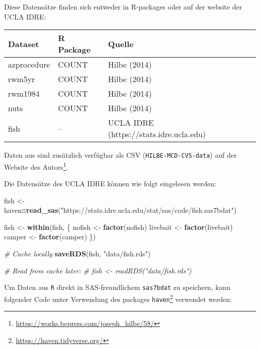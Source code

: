 \documentclass[ngerman,a4paper,]{scrartcl}
\newenvironment{Shaded}{\begin{snugshade}}{\end{snugshade}}
\newcommand{\CommentTok}[1]{\textcolor[rgb]{0.56,0.35,0.01}{\textit{#1}}}
\newcommand{\KeywordTok}[1]{\textcolor[rgb]{0.13,0.29,0.53}{\textbf{#1}}}
\newcommand{\NormalTok}[1]{#1}
\newcommand{\OperatorTok}[1]{\textcolor[rgb]{0.81,0.36,0.00}{\textbf{#1}}}
\newcommand{\StringTok}[1]{\textcolor[rgb]{0.31,0.60,0.02}{#1}}
\DeclareRobustCommand{\href}[2]{#2\footnote{\url{#1}}}
\theoremstyle{definition}
\theoremstyle{definition}
\theoremstyle{definition}
\theoremstyle{remark}
\begin{document}
Diese Datensätze finden sich entweder in R-packages oder auf der website der UCLA IDRE:

\begin{table}[H]
\centering
\begin{tabular}{lll}
\toprule
Dataset & R Package & Quelle\\
\midrule
azprocedure & COUNT & Hilbe (2014)\\
rwm5yr & COUNT & Hilbe (2014)\\
rwm1984 & COUNT & Hilbe (2014)\\
nuts & COUNT & Hilbe (2014)\\
fish & – & UCLA IDRE (https://stats.idre.ucla.edu)\\
\bottomrule
\end{tabular}
\end{table}

Daten aus \citet{hilbeModelingCountData2014} sind zusätzlich verfügbar als CSV (\texttt{HILBE-MCD-CVS-data}) auf \href{https://works.bepress.com/joseph_hilbe/58/}{der Website des Autors}.

Die Datensätze des UCLA IDRE können wie folgt eingelesen werden:

\begin{Shaded}
\begin{Highlighting}[]
\NormalTok{fish <-}\StringTok{ }\NormalTok{haven}\OperatorTok{::}\KeywordTok{read_sas}\NormalTok{(}\StringTok{"https://stats.idre.ucla.edu/stat/sas/code/fish.sas7bdat"}\NormalTok{)}

\NormalTok{fish <-}\StringTok{ }\KeywordTok{within}\NormalTok{(fish, \{}
\NormalTok{    nofish <-}\StringTok{ }\KeywordTok{factor}\NormalTok{(nofish)}
\NormalTok{    livebait <-}\StringTok{ }\KeywordTok{factor}\NormalTok{(livebait)}
\NormalTok{    camper <-}\StringTok{ }\KeywordTok{factor}\NormalTok{(camper)}
\NormalTok{\})}

\CommentTok{# Cache locally}
\KeywordTok{saveRDS}\NormalTok{(fish, }\StringTok{"data/fish.rds"}\NormalTok{)}

\CommentTok{# Read from cache later:}
\CommentTok{# fish <- readRDS("data/fish.rds")}
\end{Highlighting}
\end{Shaded}

Um Daten aus \texttt{R} direkt in SAS-freundlichem \texttt{sas7bdat} zu speichern, kann folgender Code unter Verwendung des packages \href{https://haven.tidyverse.org/}{\texttt{haven}} verwendet werden:
\end{document}
